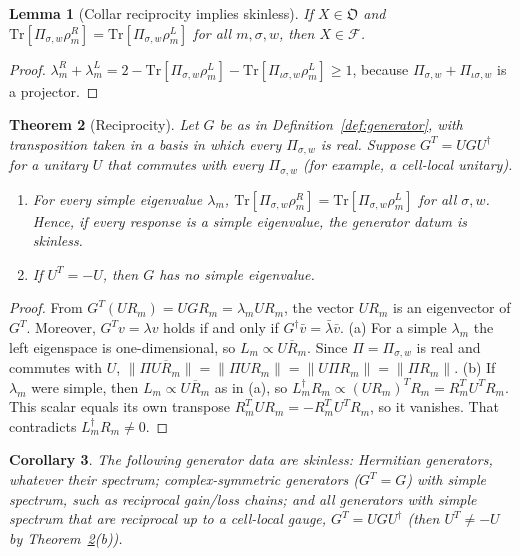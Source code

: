 \documentclass[11pt]{article}
\newtheorem{theorem}{Theorem}
\newtheorem{lemma}[theorem]{Lemma}
\newtheorem{corollary}[theorem]{Corollary}
\theoremstyle{definition}
\theoremstyle{remark}
\newcommand{\Tr}{\mathrm{Tr}}
\newcommand{\Obj}{\mathfrak{O}}
\newcommand{\Free}{\mathcal{F}}
\newcommand{\isig}{\iota\sigma}
\begin{document}
\begin{lemma}[Collar reciprocity implies skinless]\label{lem:collarrec}
If $X\in\Obj$ and $\Tr[\Pi_{\sigma,w}\rho^R_m]=\Tr[\Pi_{\sigma,w}\rho^L_m]$ for all $m,\sigma,w$, then $X\in\Free$.
\end{lemma}
\begin{proof}
$\lambda^R_m+\lambda^L_m=2-\Tr[\Pi_{\sigma,w}\rho^L_m]-\Tr[\Pi_{\isig,w}\rho^L_m]\ge1$, because $\Pi_{\sigma,w}+\Pi_{\isig,w}$ is a projector.
\end{proof}

\begin{theorem}[Reciprocity]\label{thm:recip}
Let $G$ be as in Definition~\ref{def:generator}, with transposition taken in a basis in which every $\Pi_{\sigma,w}$ is real. Suppose $G^{T}=UGU^\dagger$ for a unitary $U$ that commutes with every $\Pi_{\sigma,w}$ (for example, a cell-local unitary).
\begin{enumerate}
\item[(a)] For every simple eigenvalue $\lambda_m$, $\Tr[\Pi_{\sigma,w}\rho^R_m]=\Tr[\Pi_{\sigma,w}\rho^L_m]$ for all $\sigma,w$. Hence, if every response is a simple eigenvalue, the generator datum is skinless.
\item[(b)] If $U^{T}=-U$, then $G$ has no simple eigenvalue.
\end{enumerate}
\end{theorem}
\begin{proof}
From $G^{T}(UR_m)=UGR_m=\lambda_mUR_m$, the vector $UR_m$ is an eigenvector of $G^{T}$. Moreover, $G^{T}v=\lambda v$ holds if and only if $G^\dagger\bar v=\bar\lambda\bar v$.
(a) For a simple $\lambda_m$ the left eigenspace is one-dimensional, so $L_m\propto\overline{UR_m}$. Since $\Pi=\Pi_{\sigma,w}$ is real and commutes with $U$, $\|\Pi\overline{UR_m}\|=\|\Pi UR_m\|=\|U\Pi R_m\|=\|\Pi R_m\|$.
(b) If $\lambda_m$ were simple, then $L_m\propto\overline{UR_m}$ as in (a), so $L_m^\dagger R_m\propto(UR_m)^{T}R_m=R_m^{T}U^{T}R_m$. This scalar equals its own transpose $R_m^{T}UR_m=-R_m^{T}U^{T}R_m$, so it vanishes. That contradicts $L_m^\dagger R_m\ne0$.
\end{proof}

\begin{corollary}\label{cor:hermitian}
The following generator data are skinless: Hermitian generators, whatever their spectrum; complex-symmetric generators ($G^{T}=G$) with simple spectrum, such as reciprocal gain/loss chains; and all generators with simple spectrum that are reciprocal up to a cell-local gauge, $G^T=UGU^\dagger$ (then $U^T\neq-U$ by Theorem~\ref{thm:recip}(b)).
\end{corollary}
\end{document}
